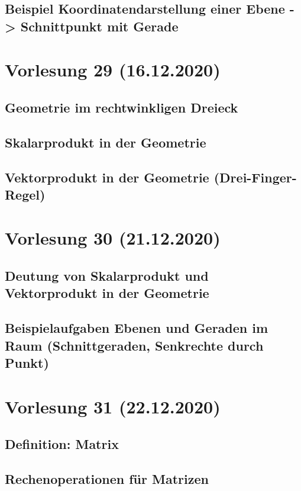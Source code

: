 \documentclass[]{article}
\begin{document}
\subsection{Beispiel Koordinatendarstellung einer Ebene -> Schnittpunkt mit Gerade}


\section{Vorlesung 29 (16.12.2020)}
\subsection{Geometrie im rechtwinkligen Dreieck}
\subsection{Skalarprodukt in der Geometrie}
\subsection{Vektorprodukt in der Geometrie (Drei-Finger-Regel)}


\section{Vorlesung 30 (21.12.2020)}
\subsection{Deutung von Skalarprodukt und Vektorprodukt in der Geometrie}
\subsection{Beispielaufgaben Ebenen und Geraden im Raum (Schnittgeraden, Senkrechte durch Punkt)}


\section{Vorlesung 31 (22.12.2020)}
\subsection{Definition: Matrix}
\subsection{Rechenoperationen für Matrizen}

\end{document}
